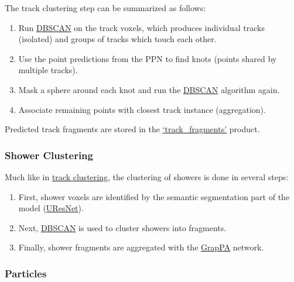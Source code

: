 \documentclass[8pt]{refart}
\begin{document}
The track clustering step can be summarized as follows:
\begin{enumerate}
    \item Run \hyperref[dbscan]{DBSCAN} on the track voxels, which produces individual tracks (isolated) and groups of tracks which touch each other.
    \item Use the point predictions from the PPN to find knots (points shared by multiple tracks).
    \item Mask a sphere around each knot and run the \hyperref[dbscan]{DBSCAN} algorithm again.
    \item Associate remaining points with closest track instance (aggregation).
\end{enumerate}

Predicted track fragments are stored in the \hyperref[trackfragments]{`track\_fragments'} product.  


\subsubsection{Shower Clustering}
Much like in \hyperref[trackclustering]{track clustering}, the clustering of showers is done in several steps:
\begin{enumerate}
    \item First, shower voxels are identified by the semantic segmentation part of the model (\hyperref[uresnet]{UResNet}).
    \item Next, \hyperref[dbscan]{DBSCAN} is used to cluster showers into fragments.
    \item Finally, shower fragments are aggregated with the \hyperref[grappa]{GrapPA} network.
\end{enumerate}


\subsubsection{Particles}
\end{document}
